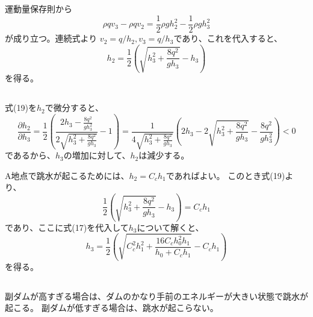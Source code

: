 \documentclass[a4paper]{jsarticle}
\begin{document}
\subsection{}
運動量保存則から
\begin{equation}
  \rho q v_3 - \rho q v_2 = \frac{1}{2} \rho g h_2^2 - \frac{1}{2} \rho g h_3^2
\end{equation}
が成り立つ。連続式より
$v_2 = q / h_2, v_3 = q / h_3$であり、これを代入すると、
\begin{equation}
  h_2 = \frac{1}{2} \left(\sqrt{h_3^2 + \frac{8 q^2}{g h_3}} - h_3\right)
\end{equation}
を得る。

\subsection{}
式(19)を$h_2$で微分すると、
\begin{equation}
  \frac{\partial h_2}{\partial h_3} =
  \frac{1}{2} \left(\frac{2h_3 - \frac{8q^2}{g h_3^2}}{2 \sqrt{h_3^2 + \frac{8q^2}{gh_3}}} - 1\right) =
  \frac{1}{4 \sqrt{h_3^2 + \frac{8q^2}{gh_3}}} \left(2h_3 - 2 \sqrt{h_3^2 + \frac{8q^2}{gh_3}} - \frac{8q^2}{gh_3^2}\right) < 0
\end{equation}
であるから、$h_3$の増加に対して、$h_2$は減少する。\par
A地点で跳水が起こるためには、$h_2 = C_c h_1$であればよい。
このとき式(19)より、
\begin{equation}
  \frac{1}{2} \left(\sqrt{h_3^2 + \frac{8 q^2}{g h_3}} - h_3\right) = C_c h_1
\end{equation}
であり、ここに式(17)を代入して$h_3$について解くと、
\begin{equation}
  h_3 = \frac{1}{2} \left(\sqrt{C_c^2 h_1^2 + \frac{16 C_c h_0^2 h_1}{h_0 + C_c h_1}} - C_c h_1\right)
\end{equation}
を得る。
\subsection{}
副ダムが高すぎる場合は、ダムのかなり手前のエネルギーが大きい状態で跳水が起こる。
副ダムが低すぎる場合は、跳水が起こらない。
\end{document}
